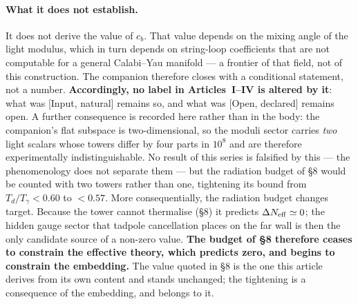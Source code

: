 \paragraph{What it does not establish.} It does not derive the value of $c_{b}$. That value depends on the mixing angle of the light modulus, which in turn depends on string-loop coefficients that are not computable for a general Calabi--Yau manifold --- a frontier of that field, not of this construction. The companion therefore closes with a conditional statement, not a number. \textbf{Accordingly, no label in Articles~I--IV is altered by it}: what was [Input, natural] remains so, and what was [Open, declared] remains open. A further consequence is recorded here rather than in the body: the companion's flat subspace is two-dimensional, so the moduli sector carries \emph{two} light scalars whose towers differ by four parts in $10^{8}$ and are therefore experimentally indistinguishable. No result of this series is falsified by this --- the phenomenology does not separate them --- but the radiation budget of \S8 would be counted with two towers rather than one, tightening its bound from $T_{d}/T_{\gamma}<0.60$ to $<0.57$. More consequentially, the radiation budget changes target. Because the tower cannot thermalise (\S8) it predicts $\Delta N_{\rm eff}\simeq0$; the hidden gauge sector that tadpole cancellation places on the far wall is then the only candidate source of a non-zero value. \textbf{The budget of \S8 therefore ceases to constrain the effective theory, which predicts zero, and begins to constrain the embedding.} The value quoted in \S8 is the one this article derives from its own content and stands unchanged; the tightening is a consequence of the embedding, and belongs to it.



